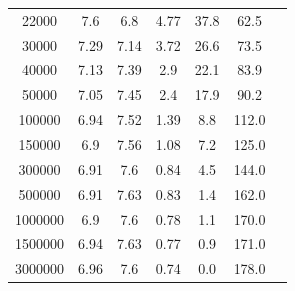 \documentclass[letterpaper,12pt]{article}
\begin{document}
\begin{table}[htbp]
{\begin{tabular}{ccccccc}
        22000 & 7.6 & 6.8 & 4.77 & 37.8 & 62.5 \\
        30000 & 7.29 & 7.14 & 3.72 & 26.6 & 73.5 \\
        40000 & 7.13 & 7.39 & 2.9 & 22.1 & 83.9 \\
        50000 & 7.05 & 7.45 & 2.4 & 17.9 & 90.2 \\
        100000 & 6.94 & 7.52 & 1.39 & 8.8 & 112.0 \\
        150000 & 6.9 & 7.56 & 1.08 & 7.2 & 125.0 \\
        300000 & 6.91 & 7.6 & 0.84 & 4.5 & 144.0 \\
        500000 & 6.91 & 7.63 & 0.83 & 1.4 & 162.0 \\
        1000000 & 6.9 & 7.6 & 0.78 & 1.1 & 170.0 \\
        1500000 & 6.94 & 7.63 & 0.77 & 0.9 & 171.0 \\
        3000000 & 6.96 & 7.6 & 0.74 & 0.0 & 178.0 \\
        \bottomrule
    \end{tabular}}
\end{table}
\end{document}
